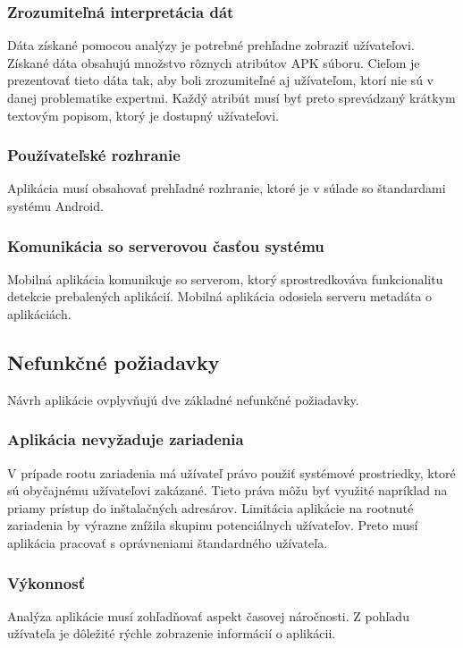 \subsubsection{\textbf{Zrozumiteľná interpretácia dát}}
Dáta získané pomocou analýzy je potrebné prehľadne zobraziť užívateľovi.  Získané dáta obsahujú množstvo rôznych atribútov APK súboru. Cieľom je prezentovať tieto dáta tak, aby boli zrozumiteľné aj užívateľom, ktorí nie sú v danej problematike expertmi. Každý atribút musí byť preto sprevádzaný krátkym textovým popisom, ktorý je dostupný užívateľovi.

\subsubsection{\textbf{Používateľské rozhranie}}
Aplikácia musí obsahovať prehľadné rozhranie, ktoré je v súlade so štandardami systému Android.

\subsubsection{\textbf{Komunikácia so serverovou časťou systému}}
Mobilná aplikácia komunikuje so serverom, ktorý sprostredkováva funkcionalitu detekcie prebalených aplikácií. Mobilná aplikácia odosiela serveru metadáta o aplikáciách.

\subsection{Nefunkčné požiadavky}
Návrh aplikácie ovplyvňujú dve základné nefunkčné požiadavky.

\subsubsection{\textbf{Aplikácia nevyžaduje  zariadenia}}
V prípade rootu zariadenia má užívateľ právo použiť systémové prostriedky, ktoré sú obyčajnému užívateľovi zakázané. Tieto práva môžu byť využité napríklad na priamy prístup do inštalačných adresárov. Limitácia aplikácie na rootnuté zariadenia by výrazne znížila skupinu potenciálnych užívateľov. Preto musí aplikácia pracovať s oprávneniami štandardného užívateľa.

\subsubsection{\textbf{Výkonnosť}}
Analýza aplikácie musí zohľadňovať aspekt časovej náročnosti. Z pohľadu užívateľa je dôležité rýchle zobrazenie informácií o aplikácii. 


